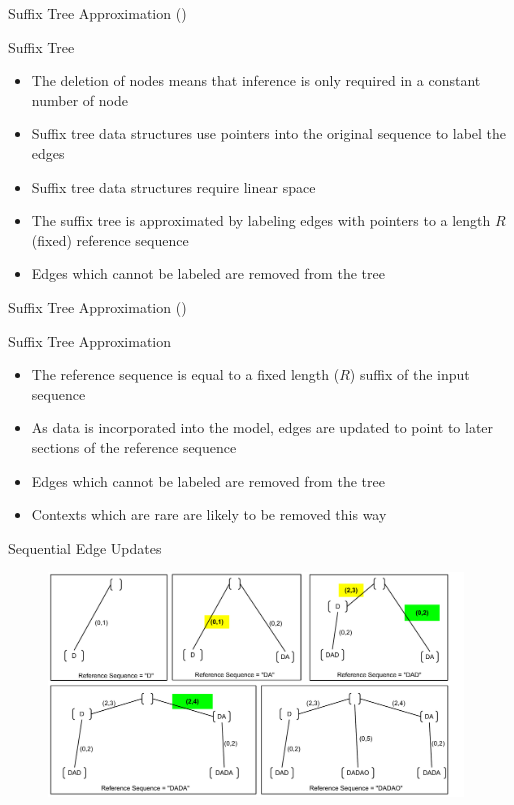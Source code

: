\documentclass{beamer}
\begin{document}
\begin{frame}[t]{Suffix Tree Approximation (\citet{Bartlett2011})}

	\begin{block}{Suffix Tree}
		\begin{itemize}
			\item The deletion of nodes means that inference is only required in a constant number of node
           \item Suffix tree data structures use pointers into the original sequence to label the edges
			\item Suffix tree data structures require linear space
			\item The suffix tree is approximated by labeling edges with pointers to a length $R$ (fixed) reference sequence
			\item Edges which cannot be labeled are removed from the tree
		\end{itemize}
	\end{block}
	
\end{frame}

\begin{frame}[t]{Suffix Tree Approximation  (\citet{Bartlett2011})}
	
	\begin{block}{Suffix Tree Approximation}
			\begin{itemize}
				\item The reference sequence is equal to a fixed length ($R$) suffix of the input sequence
				\item As data is incorporated into the model, edges are updated to point to later sections of the reference sequence
				\item Edges which cannot be labeled are removed from the tree
            	\item Contexts which are rare are likely to be removed this way
			\end{itemize}
	\end{block}
		
\end{frame}

\begin{frame}{Sequential Edge Updates}

   	\begin{figure}[t]
		\begin{center}
			\includegraphics[width = 11cm]{../figs/DADAO.pdf}
		\end{center}
	\end{figure}

\end{frame}
\end{document}
